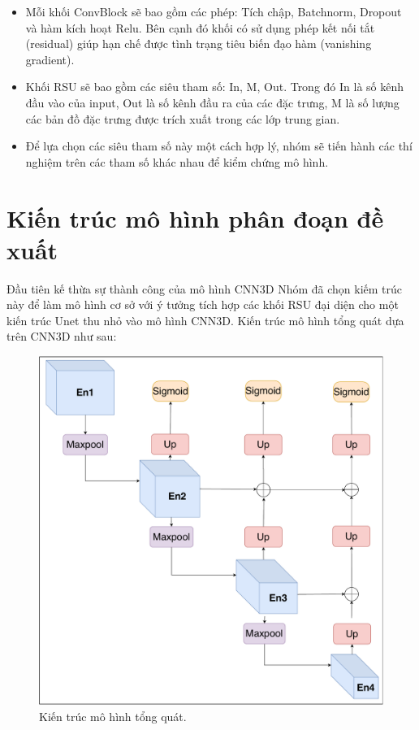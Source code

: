 \begin{itemize}
    \item Mỗi khối ConvBlock sẽ bao gồm các phép: Tích chập, Batchnorm, Dropout và hàm kích hoạt Relu. Bên cạnh đó khối có sử dụng phép kết nối tắt (residual) giúp hạn chế được tình trạng tiêu biến đạo hàm (vanishing gradient).
    \item Khối RSU sẽ bao gồm các siêu tham số: In, M, Out. Trong đó In là số kênh đầu vào của input, Out là số kênh đầu ra của các đặc trưng, M là số lượng các bản đồ đặc trưng được trích xuất trong các lớp trung gian. 
    \item[] Để lựa chọn các siêu tham số này một cách hợp lý, nhóm sẽ tiến hành các thí nghiệm trên các tham số khác nhau để kiểm chứng mô hình. 
\end{itemize}

\section{Kiến trúc mô hình phân đoạn đề xuất}\label{proposed-model}
Đầu tiên kế thừa sự thành công của mô hình CNN3D \cite{LV_LIVER} Nhóm đã chọn kiếm trúc này để làm mô hình cơ sở với ý tưởng tích hợp các khối RSU đại diện cho một kiến trúc Unet thu nhỏ vào mô hình CNN3D. Kiến trúc mô hình tổng quát dựa trên CNN3D như sau:
\begin{figure}[H]
    \centering
    \includegraphics[scale=0.6]{images/blood/u2net3d-abstract.pdf}
    \caption{Kiến trúc mô hình tổng quát.}
    \label{fig:u2net3d-abstract}
\end{figure}

